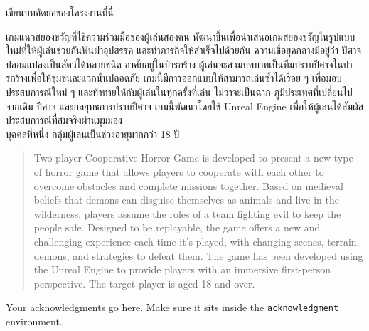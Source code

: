 \maketitle
\makesignature

\ifproject
\begin{abstractTH}
เขียนบทคัดย่อของโครงงานที่นี่

เกมแนวสยองขวัญที่ใช้ความร่วมมือของผู้เล่นสองคน พัฒนาขึ้นเพื่อนำเสนอเกมสยองขวัญในรูปแบบใหม่ที่ให้ผู้เล่นช่วยกันฟันฝ่าอุปสรรค และทำภารกิจให้สำเร็จไปด้วยกัน ความเชื่อยุคกลางมีอยู่ว่า ปีศาจปลอมแปลงเป็นสัตว์ได้หลายชนิด อาศัยอยู่ในป่ารกร้าง ผู้เล่นจะสวมบทบาทเป็นทีมปราบปีศาจในป่ารกร้างเพื่อให้ชุมชนละแวกนั้นปลอดภัย เกมนี้มีการออกแบบให้สามารถเล่นซ้ำได้เรื่อย ๆ เพื่อมอบประสบการณ์ใหม่ ๆ และท้าทายให้กับผู้เล่นในทุกครั้งที่เล่น ไม่ว่าจะเป็นฉาก ภูมิประเทศที่เปลี่ยนไปจากเดิม ปีศาจ และกลยุทธการปราบปีศาจ เกมนี้พัฒนาโดยใช้ Unreal Engine เพื่อให้ผู้เล่นได้สัมผัสประสบการณ์ที่สมจริงผ่านมุมมอง \\ บุคคลที่หนึ่ง กลุ่มผู้เล่นเป็นช่วงอายุมากกว่า 18 ปี
\end{abstractTH}

\begin{abstract}
Two-player Cooperative Horror Game is developed to present a new type of horror game that allows players to cooperate with each other to overcome obstacles and complete missions together. Based on medieval beliefs that demons can disguise themselves as animals and live in the wilderness, players assume the roles of a team fighting evil to keep the people safe. Designed to be replayable, the game offers a new and challenging experience each time it's played, with changing scenes, terrain, demons, and strategies to defeat them. The game has been developed using the Unreal Engine to provide players with an immersive first-person perspective. The target player is aged 18 and over.
\end{abstract}

\iffalse
\begin{dedication}
This document is dedicated to all Chiang Mai University students.

Dedication page is optional.
\end{dedication}
\fi %

\begin{acknowledgments}
Your acknowledgments go here. Make sure it sits inside the
\texttt{acknowledgment} environment.

\end{acknowledgments}%
\fi %

\contentspage

\ifproject
\figurelistpage

\tablelistpage
\fi %



